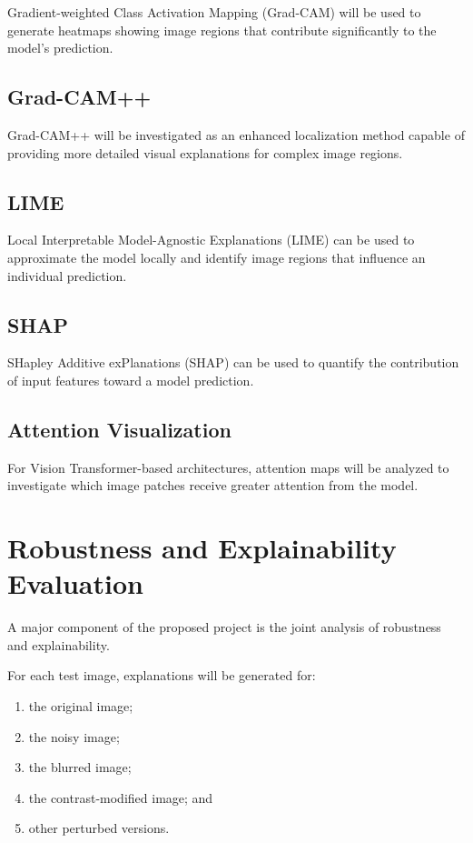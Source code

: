 \documentclass[12pt,a4paper]{article}
\begin{document}
Gradient-weighted Class Activation Mapping (Grad-CAM) will be used to generate heatmaps showing image regions that contribute significantly to the model's prediction.

\subsection{Grad-CAM++}

Grad-CAM++ will be investigated as an enhanced localization method capable of providing more detailed visual explanations for complex image regions.

\subsection{LIME}

Local Interpretable Model-Agnostic Explanations (LIME) can be used to approximate the model locally and identify image regions that influence an individual prediction.

\subsection{SHAP}

SHapley Additive exPlanations (SHAP) can be used to quantify the contribution of input features toward a model prediction.

\subsection{Attention Visualization}

For Vision Transformer-based architectures, attention maps will be analyzed to investigate which image patches receive greater attention from the model.

\section{Robustness and Explainability Evaluation}

A major component of the proposed project is the joint analysis of robustness and explainability.

For each test image, explanations will be generated for:

\begin{enumerate}
    \item the original image;
    \item the noisy image;
    \item the blurred image;
    \item the contrast-modified image; and
    \item other perturbed versions.
\end{enumerate}
\end{document}
